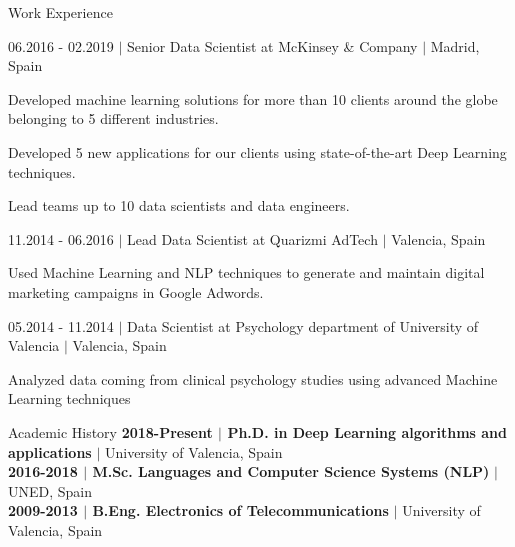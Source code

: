 \documentclass{resume} %
\begin{document}
\begin{rSection}{Work Experience}
\begin{rSubsection}{06.2016 - 02.2019 $|$ Senior Data Scientist at McKinsey \& Company  $|$ \textnormal{Madrid, Spain}}{}{}

    \vspace{-3pt}

    \item Developed machine learning solutions for more than 10 clients around the globe belonging to 5 different industries.
    \item Developed 5 new applications for our clients using state-of-the-art Deep Learning techniques.
    \item Lead teams up to 10 data scientists and data engineers.
\end{rSubsection}

\vspace{-6pt}

\begin{rSubsection}{11.2014 - 06.2016 $|$ Lead Data Scientist at Quarizmi AdTech  $|$  \textnormal{Valencia, Spain}}{}{}

    \vspace{-3pt}

    \item Used Machine Learning and NLP techniques to generate and maintain digital marketing campaigns in Google Adwords.
\end{rSubsection}

\vspace{-6pt}

\begin{rSubsection}{05.2014 - 11.2014 $|$ Data Scientist at Psychology department of University of Valencia  $|$  \textnormal{Valencia, Spain}}{}{}

    \vspace{-3pt}

    \item Analyzed data coming from clinical psychology studies using advanced Machine Learning techniques

\end{rSubsection}


\end{rSection}


\begin{rSection}{Academic History}
{\textbf{2018-Present $|$ Ph.D. in Deep Learning algorithms and applications}  $|$  University of Valencia, Spain}
\\
{\textbf{2016-2018 $|$ M.Sc. Languages and Computer Science Systems (NLP)}  $|$  UNED, Spain}
\\
{\textbf{2009-2013 $|$ B.Eng. Electronics of Telecommunications}  $|$ University of Valencia, Spain}
\end{rSection}
\end{document}
